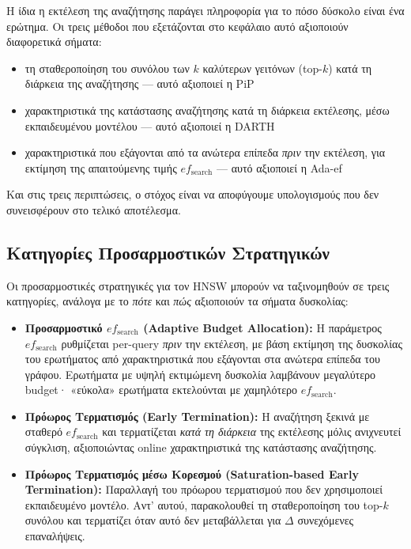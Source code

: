 \documentclass[12pt,a4paper]{article}
\begin{document}
Η ίδια η εκτέλεση της αναζήτησης παράγει πληροφορία για το πόσο δύσκολο είναι ένα ερώτημα. Οι τρεις μέθοδοι που εξετάζονται στο κεφάλαιο αυτό αξιοποιούν διαφορετικά σήματα:
\begin{itemize}
    \item τη σταθεροποίηση του συνόλου των $k$ καλύτερων γειτόνων (top-$k$) κατά τη διάρκεια της αναζήτησης --- αυτό αξιοποιεί η PiP
    \item χαρακτηριστικά της κατάστασης αναζήτησης κατά τη διάρκεια εκτέλεσης, μέσω εκπαιδευμένου μοντέλου --- αυτό αξιοποιεί η DARTH
    \item χαρακτηριστικά που εξάγονται από τα ανώτερα επίπεδα \emph{πριν} την εκτέλεση, για εκτίμηση της απαιτούμενης τιμής $ef_{\text{search}}$ --- αυτό αξιοποιεί η Ada-ef
\end{itemize}
Και στις τρεις περιπτώσεις, ο στόχος είναι να αποφύγουμε υπολογισμούς που δεν συνεισφέρουν στο τελικό αποτέλεσμα.

\subsection{Κατηγορίες Προσαρμοστικών Στρατηγικών}
Οι προσαρμοστικές στρατηγικές για τον HNSW μπορούν να ταξινομηθούν σε τρεις κατηγορίες, ανάλογα με το \emph{πότε} και \emph{πώς} αξιοποιούν τα σήματα δυσκολίας:

\begin{itemize}
    \item \textbf{Προσαρμοστικό $ef_{\text{search}}$ (Adaptive Budget Allocation):} Η παράμετρος $ef_{\text{search}}$ ρυθμίζεται per-query \emph{πριν} την εκτέλεση, με βάση εκτίμηση της δυσκολίας του ερωτήματος από χαρακτηριστικά που εξάγονται στα ανώτερα επίπεδα του γράφου. Ερωτήματα με υψηλή εκτιμώμενη δυσκολία λαμβάνουν μεγαλύτερο budget· «εύκολα» ερωτήματα εκτελούνται με χαμηλότερο $ef_{\text{search}}$.
    \item \textbf{Πρόωρος Τερματισμός (Early Termination):} Η αναζήτηση ξεκινά με σταθερό $ef_{\text{search}}$ και τερματίζεται \emph{κατά τη διάρκεια} της εκτέλεσης μόλις ανιχνευτεί σύγκλιση, αξιοποιώντας online χαρακτηριστικά της κατάστασης αναζήτησης.
    \item \textbf{Πρόωρος Τερματισμός μέσω Κορεσμού (Saturation-based Early Termination):} Παραλλαγή του πρόωρου τερματισμού που δεν χρησιμοποιεί εκπαιδευμένο μοντέλο. Αντ' αυτού, παρακολουθεί τη σταθεροποίηση του top-$k$ συνόλου και τερματίζει όταν αυτό δεν μεταβάλλεται για $\Delta$ συνεχόμενες επαναλήψεις.
\end{itemize}
\end{document}
